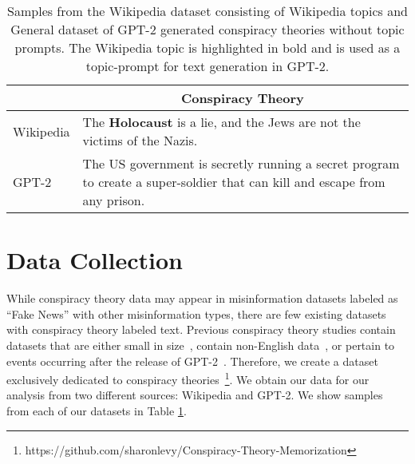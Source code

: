 \documentclass[11pt,a4paper]{article}
\begin{document}
\begin{table}[t]
\centering
\begin{tabular}{p{1.6cm}|p{5.4cm}}
\toprule
&  \multicolumn{1}{c}{Conspiracy Theory} \\
\hline
Wikipedia &  The \textbf{Holocaust} is a lie, and the Jews are not the victims of the Nazis.  \\
\hline
GPT-2 &   
The US government is secretly running a secret program to create a super-soldier that can kill and escape from any prison. \\
\bottomrule
 \end{tabular}
\caption{Samples from the Wikipedia dataset consisting of Wikipedia topics and General dataset of GPT-2 generated conspiracy theories without topic prompts. The Wikipedia topic is highlighted in bold and is used as a topic-prompt for text generation in GPT-2.
}\label{tab:example}
\end{table}

\section{Data Collection}
While conspiracy theory data may appear in misinformation datasets labeled as ``Fake News'' with other misinformation types, there are few existing datasets with conspiracy theory labeled text. Previous conspiracy theory studies contain datasets that are either small in size~\cite{oliver2014conspiracy}, contain non-English data~\cite{bessi2015science}, or pertain to events occurring after the release of GPT-2~\cite{ahmed2020covid,uscinski2020people}. Therefore, we create a dataset exclusively dedicated to conspiracy theories~\footnote{https://github.com/sharonlevy/Conspiracy-Theory-Memorization}. We obtain our data for our analysis from two different sources: Wikipedia and GPT-2. We show samples from each of our datasets in Table \ref{tab:example}.
\end{document}
